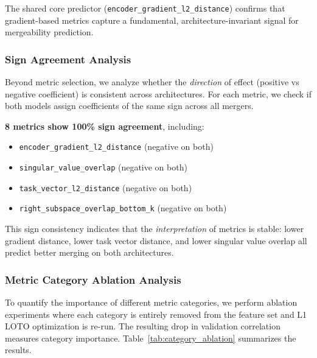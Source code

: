 The shared core predictor (\texttt{encoder\_gradient\_l2\_distance}) confirms that gradient-based metrics capture a fundamental, architecture-invariant signal for mergeability prediction.

\subsubsection{Sign Agreement Analysis}

Beyond metric selection, we analyze whether the \emph{direction} of effect (positive vs negative coefficient) is consistent across architectures. For each metric, we check if both models assign coefficients of the same sign across all mergers.

\textbf{8 metrics show 100\% sign agreement}, including:
\begin{itemize}
    \item \texttt{encoder\_gradient\_l2\_distance} (negative on both)
    \item \texttt{singular\_value\_overlap} (negative on both)
    \item \texttt{task\_vector\_l2\_distance} (negative on both)
    \item \texttt{right\_subspace\_overlap\_bottom\_k} (negative on both)
\end{itemize}

This sign consistency indicates that the \emph{interpretation} of metrics is stable: lower gradient distance, lower task vector distance, and lower singular value overlap all predict better merging on both architectures.

\subsubsection{Metric Category Ablation Analysis}

To quantify the importance of different metric categories, we perform ablation experiments where each category is entirely removed from the feature set and L1 LOTO optimization is re-run. The resulting drop in validation correlation measures category importance. Table~\ref{tab:category_ablation} summarizes the results.

